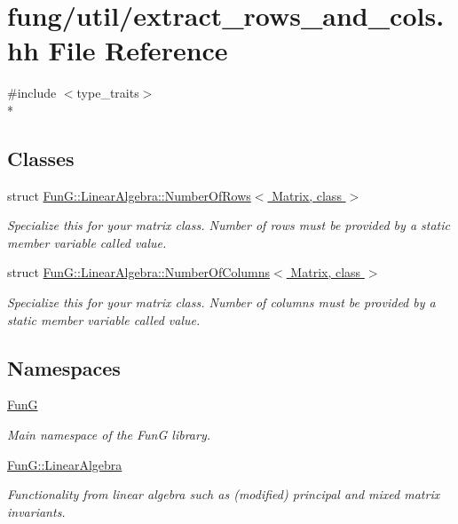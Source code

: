 \hypertarget{extract__rows__and__cols_8hh}{}\section{fung/util/extract\+\_\+rows\+\_\+and\+\_\+cols.hh File Reference}
\label{extract__rows__and__cols_8hh}
{\ttfamily \#include $<$type\+\_\+traits$>$}\\*
\subsection*{Classes}
\begin{DoxyCompactItemize}
\item 
struct \hyperlink{structFunG_1_1LinearAlgebra_1_1NumberOfRows}{Fun\+G\+::\+Linear\+Algebra\+::\+Number\+Of\+Rows$<$ Matrix, class $>$}
\begin{DoxyCompactList}\small\item\em Specialize this for your matrix class. Number of rows must be provided by a static member variable called value. \end{DoxyCompactList}\item 
struct \hyperlink{structFunG_1_1LinearAlgebra_1_1NumberOfColumns}{Fun\+G\+::\+Linear\+Algebra\+::\+Number\+Of\+Columns$<$ Matrix, class $>$}
\begin{DoxyCompactList}\small\item\em Specialize this for your matrix class. Number of columns must be provided by a static member variable called value. \end{DoxyCompactList}\end{DoxyCompactItemize}
\subsection*{Namespaces}
\begin{DoxyCompactItemize}
\item 
 \hyperlink{namespaceFunG}{FunG}
\begin{DoxyCompactList}\small\item\em Main namespace of the FunG library. \end{DoxyCompactList}\item 
 \hyperlink{namespaceFunG_1_1LinearAlgebra}{Fun\+G\+::\+Linear\+Algebra}
\begin{DoxyCompactList}\small\item\em Functionality from linear algebra such as (modified) principal and mixed matrix invariants. \end{DoxyCompactList}\end{DoxyCompactItemize}
